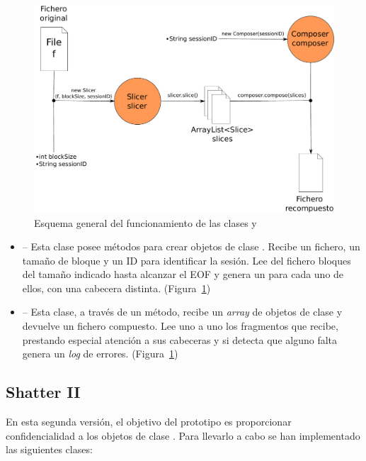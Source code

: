 \begin{figure}[!htb]
  \centering
  \includegraphics[scale=0.5]{Figures/Assembler}
  \decoRule
  \caption[ - ]{Esquema general del funcionamiento de las clases  y }
  \label{fig:Assembler}
\end{figure}

\begin{itemize}
  \item {} -- Esta clase posee métodos para crear objetos de clase . Recibe un fichero, un tamaño de bloque y un ID para identificar la sesión. Lee del fichero bloques del tamaño indicado hasta alcanzar el EOF y genera un  para cada uno de ellos, con una cabecera distinta. (Figura~\ref{fig:Assembler})

  \item {} -- Esta clase, a través de un método, recibe un \emph{array} de objetos de clase  y devuelve un fichero compuesto. Lee uno a uno los fragmentos que recibe, prestando especial atención a sus cabeceras y si detecta que alguno falta genera un \emph{log} de errores. (Figura~\ref{fig:Assembler})
\end{itemize}

\subsection{Shatter II}

En esta segunda versión, el objetivo del prototipo es proporcionar confidencialidad a los objetos de clase . Para llevarlo a cabo se han implementado las siguientes clases:

